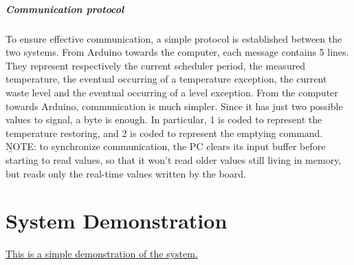 \documentclass[a4paper,12pt]{report}
\begin{document}
	\paragraph{Communication protocol} To ensure effective communication, a simple protocol is established between the two systems.
	\newline From Arduino towards the computer, each message contains 5 lines. They represent respectively the current scheduler period, the measured temperature, the eventual occurring of a temperature exception, the current waste level and the eventual occurring of a level exception.
	\newline From the computer towards Arduino, communication is much simpler. Since it has just two possible values to signal, a byte is enough. In particular, 1 is coded to represent the temperature restoring, and 2 is coded to represent the emptying command.
	\newline \b{NOTE:} to synchronize communication, the PC clears its input buffer before starting to read values, so that it won't read older values still living in memory, but reads only the real-time values written by the board.
	
	\chapter{System Demonstration}
	\href{https://drive.google.com/file/d/1WgMCrVB_kaROzejK9e0wBk0y-nm3afkx/view?usp=sharing}{This is a simple demonstration of the system.}
	
\end{document}
